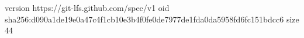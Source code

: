 version https://git-lfs.github.com/spec/v1
oid sha256:d090a1de19e0a47c4f1cb10e3b4f0fe0de7977de1fda0da5958fd6fc151bdcc6
size 44
